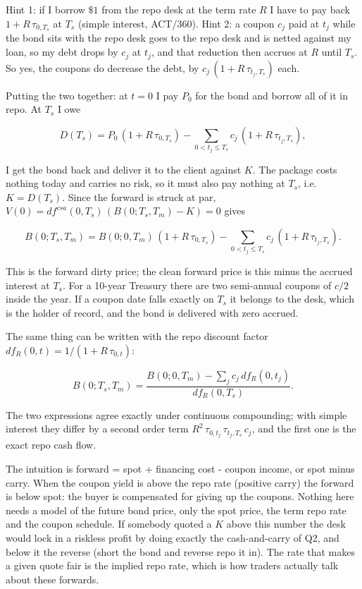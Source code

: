 \documentclass[11pt]{article}
\begin{document}
Hint 1: if I borrow $\$1$ from the repo desk at the term rate $R$ I have to pay back $1 + R\,\tau_{0,T_s}$ at $T_s$ (simple interest, ACT/360). Hint 2: a coupon $c_j$ paid at $t_j$ while the bond sits with the repo desk goes to the repo desk and is netted against my loan, so my debt drops by $c_j$ at $t_j$, and that reduction then accrues at $R$ until $T_s$. So yes, the coupons do decrease the debt, by $c_j\,(1 + R\,\tau_{t_j,T_s})$ each.

Putting the two together: at $t = 0$ I pay $P_0$ for the bond and borrow all of it in repo. At $T_s$ I owe

\[D(T_s) = P_0\,(1 + R\,\tau_{0,T_s}) - \sum_{0<t_j\le T_s} c_j\,(1 + R\,\tau_{t_j,T_s}),\]

I get the bond back and deliver it to the client against $K$. The package costs nothing today and carries no risk, so it must also pay nothing at $T_s$, i.e. $K = D(T_s)$. Since the forward is struck at par, $V(0) = df^{csa}(0,T_s)\,(B(0;T_s,T_m) - K) = 0$ gives

\[B(0;T_s,T_m) = B(0;0,T_m)\,(1 + R\,\tau_{0,T_s}) - \sum_{0<t_j\le T_s} c_j\,(1 + R\,\tau_{t_j,T_s}).\]

This is the forward dirty price; the clean forward price is this minus the accrued interest at $T_s$. For a 10-year Treasury there are two semi-annual coupons of $c/2$ inside the year. If a coupon date falls exactly on $T_s$ it belongs to the desk, which is the holder of record, and the bond is delivered with zero accrued.

The same thing can be written with the repo discount factor $df_R(0,t) = 1/(1 + R\,\tau_{0,t})$:

\[B(0;T_s,T_m) = \frac{B(0;0,T_m) - \sum_j c_j\,df_R(0,t_j)}{df_R(0,T_s)}.\]

The two expressions agree exactly under continuous compounding; with simple interest they differ by a second order term $R^2\,\tau_{0,t_j}\,\tau_{t_j,T_s}\,c_j$, and the first one is the exact repo cash flow.

The intuition is forward = spot + financing cost - coupon income, or spot minus carry. When the coupon yield is above the repo rate (positive carry) the forward is below spot: the buyer is compensated for giving up the coupons. Nothing here needs a model of the future bond price, only the spot price, the term repo rate and the coupon schedule. If somebody quoted a $K$ above this number the desk would lock in a riskless profit by doing exactly the cash-and-carry of Q2, and below it the reverse (short the bond and reverse repo it in). The rate that makes a given quote fair is the implied repo rate, which is how traders actually talk about these forwards.
\end{document}
